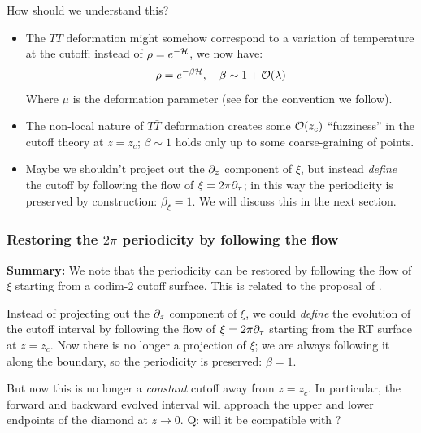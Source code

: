 \documentclass[11pt,a4paper]{article}
\newcommand{\TTbar}{\ensuremath{T\bar{T}}\xspace}
\begin{document}
\pagebreak[3]
	
	How should we understand this?
	\begin{itemize}
	\item The \TTbar deformation might somehow correspond to a variation of temperature at the cutoff; instead of $\rho = e^{-\mathcal{H}}$, we now have:
	\begin{equation}
		\rho = e^{-\beta\mcal{H}},
	\quad \beta \sim 1 + \order{\lambda}
	\end{equation}
	Where $\mu$ is the deformation parameter (see \cite{Apolo:2019zai} for the convention we follow). 
	
	\item The non-local nature of \TTbar deformation creates some $\order{z_c}$ ``fuzziness'' in the cutoff theory at $z = z_c$; $\beta \sim 1$ holds only up to some coarse-graining of points. 
	
	\item Maybe we shouldn't project out the $\partial_{z}$ component of $\xi$, but instead \textit{define} the cutoff by following the flow of $\xi = 2\pi\partial_{\tau}$; in this way the periodicity is preserved by construction: $\beta_\xi = 1$. We will discuss this in the next section. 
	\end{itemize}
	
\pagebreak


\subsubsection{Restoring the $2\pi$ periodicity by following the flow}
	
\textbf{Summary:} We note that the periodicity can be restored by following the flow of $\xi$ starting from a codim-2 cutoff surface. This is related to the proposal of \cite{Grado-White:2020wlb}. 
	
	Instead of projecting out the $\partial_{z}$ component of $\xi$, we could \textit{define} the evolution of the cutoff interval by following the flow of $\xi = 2\pi\partial_{\tau}$ starting from the RT surface at $z = z_c$. Now there is no longer a projection of $\xi$; we are always following it along the boundary, so the periodicity is preserved: $\beta = 1$. 
	
	But now this is no longer a \textit{constant} cutoff away from $z = z_c$. In particular, the forward and backward evolved interval will approach the upper and lower endpoints of the diamond at $z \to 0$. Q: will it be compatible with \textcite{McGough:2016lol}? 
	
\end{document}
